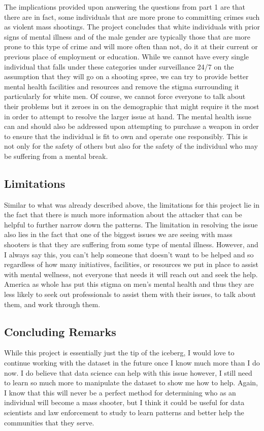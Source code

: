 \documentclass[
]{article}
\begin{document}
The implications provided upon answering the questions from part 1 are
that there are in fact, some individuals that are more prone to
committing crimes such as violent mass shootings. The project concludes
that white individuals with prior signs of mental illness and of the
male gender are typically those that are more prone to this type of
crime and will more often than not, do it at their current or previous
place of employment or education. While we cannot have every single
individual that falls under these categories under surveillance 24/7 on
the assumption that they will go on a shooting spree, we can try to
provide better mental health facilities and resources and remove the
stigma surrounding it particularly for white men. Of course, we cannot
force everyone to talk about their problems but it zeroes in on the
demographic that might require it the most in order to attempt to
resolve the larger issue at hand. The mental health issue can and should
also be addressed upon attempting to purchase a weapon in order to
ensure that the individual is fit to own and operate one responsibly.
This is not only for the safety of others but also for the safety of the
individual who may be suffering from a mental break.

\subsection{Limitations}\label{limitations}

Similar to what was already described above, the limitations for this
project lie in the fact that there is much more information about the
attacker that can be helpful to further narrow down the patterns. The
limitation in resolving the issue also lies in the fact that one of the
biggest issues we are seeing with mass shooters is that they are
suffering from some type of mental illness. However, and I always say
this, you can't help someone that doesn't want to be helped and so
regardless of how many initiatives, facilities, or resources we put in
place to assist with mental wellness, not everyone that needs it will
reach out and seek the help. America as whole has put this stigma on
men's mental health and thus they are less likely to seek out
professionals to assist them with their issues, to talk about them, and
work through them.

\subsection{Concluding Remarks}\label{concluding-remarks}

While this project is essentially just the tip of the iceberg, I would
love to continue working with the dataset in the future once I know much
more than I do now. I do believe that data science can help with this
issue however, I still need to learn so much more to manipulate the
dataset to show me how to help. Again, I know that this will never be a
perfect method for determining who as an individual will become a mass
shooter, but I think it could be useful for data scientists and law
enforcement to study to learn patterns and better help the communities
that they serve.
\end{document}

